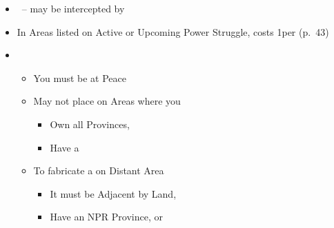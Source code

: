 \documentclass[10pt]{article}
\begin{document}
\begin{itemize}
	\item \covertaction~-- may be intercepted by 
	\item In Areas listed on Active or Upcoming Power Struggle, costs 1\diplopower per \claim (p.~43)
	\item {}
	\begin{itemize}
		\item You must be at Peace
		\item May not place \claim on Areas where you
		\begin{itemize}
			\item Own all Provinces,  
			\item Have a \claim
		\end{itemize}
		\item To fabricate a \claim on Distant Area
		\begin{itemize}
			\item It must be Adjacent by Land, 
			\item Have an NPR Province, \vassal or \town
		\end{itemize}
	\end{itemize}
\end{itemize}
\end{document}
